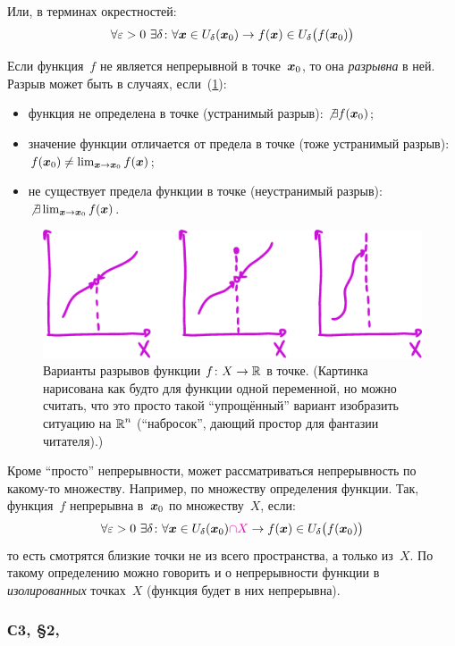 \documentclass[a4paper,12pt]{article}
\begin{document}
  Или, в терминах окрестностей:
  \[
    \forall \varepsilon > 0\ \exists \delta\colon \forall \boldsymbol x \in U_{\delta}(\boldsymbol x_0) \to f(\boldsymbol x) \in U_{\delta}\bigl(f(\boldsymbol x_0)\bigr)
  \]

  Если функция~$f$ не является непрерывной в точке~$\boldsymbol x_0$, то она \emph{разрывна} в ней.
  Разрыв может быть в случаях, если~(\ref{fig:disconts}):
  \begin{itemize}
    \item функция не определена в точке (устранимый разрыв): $\not\exists f(\boldsymbol x_0)$;
    \item значение функции отличается от предела в точке (тоже устранимый разрыв): $f(\bds x_0) \hm{\not=} \lim_{\bds x \to \bds x_0} f(\bds x)$;
    \item не существует предела функции в точке (неустранимый разрыв): $\not\exists \lim_{\boldsymbol x \to \boldsymbol x_0} f(\boldsymbol x)$.
  \end{itemize}

  \begin{figure}[ht]
    \centering
    \includegraphics[width=0.6\linewidth]{images/disconts}
    
    \caption{
      Варианты разрывов функции $f\colon X \to \operatorname{\mathbb R}$ в точке.
      (Картинка нарисована как будто для функции одной переменной, но можно считать, что это просто такой ``упрощённый'' вариант изобразить ситуацию на $\operatorname{\mathbb R}^n$ (``набросок'', дающий простор для фантазии читателя).)
    }
    \label{fig:disconts}
  \end{figure}

  Кроме ``просто'' непрерывности, может рассматриваться непрерывность по какому-то множеству.
  Например, по множеству определения функции.
  Так, функция~$f$ непрерывна в~$\boldsymbol x_0$ по множеству~$X$, если:
  \[
    \forall \eps > 0\ \exists \delta\colon \forall \bds x \in U_{\delta}(\bds x_0) \textcolor{pink}{\cap X} \to f(\bds x) \in U_{\delta}\bigl(f(\bds x_0)\bigr)
  \]
  то есть смотрятся близкие точки не из всего пространства, а только из~$X$.
  По такому определению можно говорить и о непрерывности функции в \emph{изолированных} точках~$X$ (функция будет в них непрерывна).  %


  \subsubsection{С3, \S 2, }
\end{document}
